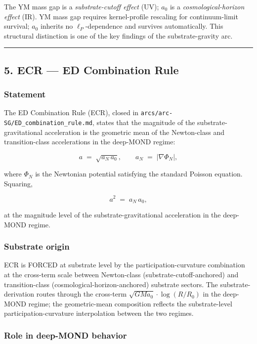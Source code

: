 \documentclass[
  11pt,a4paper]{article}
\begin{document}
The YM mass gap is a \emph{substrate-cutoff effect} (UV); \(a_0\) is a
\emph{cosmological-horizon effect} (IR). YM mass gap requires
kernel-profile rescaling for continuum-limit survival; \(a_0\) inherits
no \(\ell_P\)-dependence and survives automatically. This structural
distinction is one of the key findings of the substrate-gravity arc.

\begin{center}\rule{0.5\linewidth}{0.5pt}\end{center}

\subsection{5. ECR --- ED Combination
Rule}\label{ecr-ed-combination-rule}

\subsubsection{Statement}\label{statement}

The ED Combination Rule (ECR), closed in
\texttt{arcs/arc-SG/ED\_combination\_rule.md}, states that the magnitude
of the substrate-gravitational acceleration is the geometric mean of the
Newton-class and transition-class accelerations in the deep-MOND regime:

\[a \;=\; \sqrt{a_N\,a_0}, \qquad a_N \;=\; |\nabla\Phi_N|,\]

where \(\Phi_N\) is the Newtonian potential satisfying the standard
Poisson equation. Squaring,

\[a^2 \;=\; a_N\,a_0,\]

at the magnitude level of the substrate-gravitational acceleration in
the deep-MOND regime.

\subsubsection{Substrate origin}\label{substrate-origin}

ECR is FORCED at substrate level by the participation-curvature
combination at the cross-term scale between Newton-class
(substrate-cutoff-anchored) and transition-class
(cosmological-horizon-anchored) substrate sectors. The
substrate-derivation routes through the cross-term
\(\sqrt{GMa_0}\cdot\log(R/R_0)\) in the deep-MOND regime; the
geometric-mean composition reflects the substrate-level
participation-curvature interpolation between the two regimes.

\subsubsection{Role in deep-MOND
behavior}\label{role-in-deep-mond-behavior}
\end{document}
